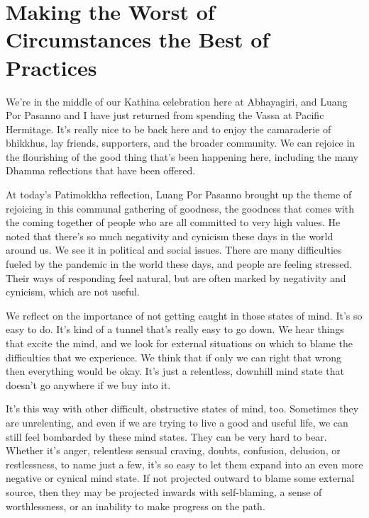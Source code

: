 
{\centering
\chapter{Making the Worst of Circumstances the Best of Practices}
\par}

We're in the middle of our Kathina celebration here at Abhayagiri, and Luang Por Pasanno and I have just returned from spending the Vassa at Pacific Hermitage. It's really nice to be back here and to enjoy the camaraderie of bhikkhus, lay friends, supporters, and the broader community. We can rejoice in the flourishing of the good thing that's been happening here, including the many Dhamma reflections that have been offered.

At today's Patimokkha reflection, Luang Por Pasanno brought up the theme of rejoicing in this communal gathering of goodness, the goodness that comes with the coming together of people who are all committed to very high values. He noted that there's so much negativity and cynicism these days in the world around us. We see it in political and social issues. There are many difficulties fueled by the pandemic in the world these days, and people are feeling stressed. Their ways of responding feel natural, but are often marked by negativity and cynicism, which are not useful.

We reflect on the importance of not getting caught in those states of mind. It's so easy to do. It's kind of a tunnel that's really easy to go down. We hear things that excite the mind, and we look for external situations on which to blame the difficulties that we experience. We think that if only we can right that wrong then everything would be okay. It's just a relentless, downhill mind state that doesn't go anywhere if we buy into it.

It's this way with other difficult, obstructive states of mind, too. Sometimes they are unrelenting, and even if we are trying to live a good and useful life, we can still feel bombarded by these mind states. They can be very hard to bear. Whether it's anger, relentless sensual craving, doubts, confusion, delusion, or restlessness, to name just a few, it's so easy to let them expand into an even more negative or cynical mind state. If not projected outward to blame some external source, then they may be projected inwards with self-blaming, a sense of worthlessness, or an inability to make progress on the path.


